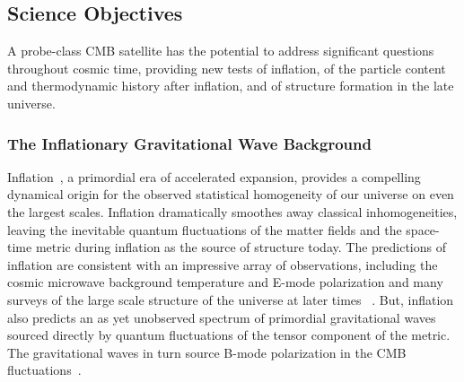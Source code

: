 
\subsection{Science Objectives}
\label{sec:science}

\vspace{-0.05in}

 A probe-class CMB satellite has the potential to address significant questions throughout cosmic time, providing new tests of inflation, of the particle content and thermodynamic history after inflation, and of structure formation in the late universe. 
 
\subsubsection{The Inflationary Gravitational Wave Background}

\vspace{-0.05in}


Inflation~\cite{guth81,linde82,albrecht82,sato81,kolb94}, a primordial era of accelerated expansion, provides a compelling dynamical origin for the observed statistical homogeneity of our universe on even the largest scales. Inflation dramatically smoothes away classical inhomogeneities, leaving the inevitable quantum fluctuations of the matter fields and the space-time metric during inflation as the source of structure today.
The predictions of inflation are consistent with an impressive array of observations, including the cosmic microwave background temperature and E-mode polarization and many surveys of the large scale structure of the universe at later times ~\cite{spergel06,Tegmark:2006az,planck2015parameters,planck2015inflation}. But, inflation also predicts an as yet unobserved spectrum of primordial gravitational waves sourced directly by quantum fluctuations of the tensor component of the metric. The gravitational waves in turn source B-mode polarization in the CMB fluctuations~\cite{kamionkowski97a,zaldarriaga97}.  

